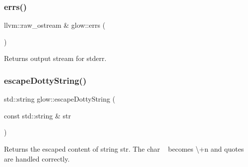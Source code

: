 \subsubsection{\texorpdfstring{errs()}{errs()}}
{\footnotesize\ttfamily llvm\+::raw\+\_\+ostream \& glow\+::errs (\begin{DoxyParamCaption}{ }\end{DoxyParamCaption})}

\begin{DoxyReturn}{Returns}
output stream for stderr. 
\end{DoxyReturn}
\mbox{\label{namespaceglow_a0c9f98855ca17db059deb4688e051e61}} 
\subsubsection{\texorpdfstring{escape\+Dotty\+String()}{escapeDottyString()}}
{\footnotesize\ttfamily std\+::string glow\+::escape\+Dotty\+String (\begin{DoxyParamCaption}\item[{const std\+::string \&}]{str }\end{DoxyParamCaption})}

\begin{DoxyReturn}{Returns}
the escaped content of string {\ttfamily str}. The char \textquotesingle{}~\newline
\textquotesingle{} becomes \textquotesingle{}\textbackslash{}\textquotesingle{}+\textquotesingle{}n\textquotesingle{} and quotes are handled correctly. 
\end{DoxyReturn}
\mbox{\label{namespaceglow_ad7385d41afaa1bd063dfa1b74e693ad1}} 
